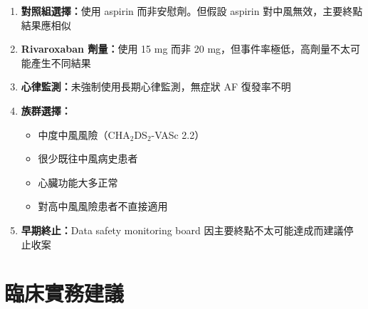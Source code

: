 \documentclass[12pt,a4paper]{article}
\begin{document}
\begin{enumerate}
    \item \textbf{對照組選擇：}使用 aspirin 而非安慰劑。但假設 aspirin 對中風無效，主要終點結果應相似

    \item \textbf{Rivaroxaban 劑量：}使用 15 mg 而非 20 mg，但事件率極低，高劑量不太可能產生不同結果

    \item \textbf{心律監測：}未強制使用長期心律監測，無症狀 AF 復發率不明

    \item \textbf{族群選擇：}
    \begin{itemize}
        \item 中度中風風險（CHA$_2$DS$_2$-VASc 2.2）
        \item 很少既往中風病史患者
        \item 心臟功能大多正常
        \item 對高中風風險患者不直接適用
    \end{itemize}

    \item \textbf{早期終止：}Data safety monitoring board 因主要終點不太可能達成而建議停止收案
\end{enumerate}

\section{臨床實務建議}
\end{document}
